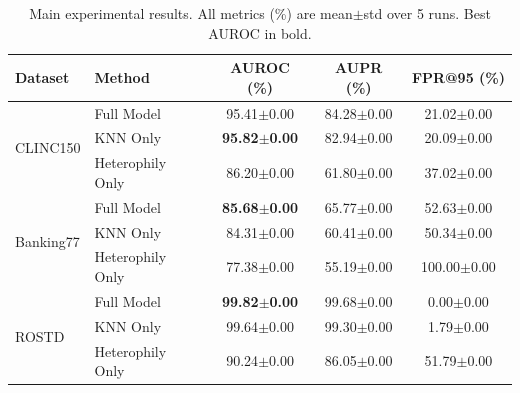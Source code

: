 \begin{table}[t]
\centering
\caption{Main experimental results. All metrics (\%) are mean$\pm$std over 5 runs. Best AUROC in bold.}
\label{tab:main_results}
\begin{tabular}{llccc}
\toprule
Dataset & Method & AUROC (\%) & AUPR (\%) & FPR@95 (\%) \\
\midrule
\multirow{3}{*}{CLINC150}
& Full Model & 95.41$\pm$0.00 & 84.28$\pm$0.00 & 21.02$\pm$0.00 \\
& KNN Only & \textbf{95.82$\pm$0.00} & 82.94$\pm$0.00 & 20.09$\pm$0.00 \\
& Heterophily Only & 86.20$\pm$0.00 & 61.80$\pm$0.00 & 37.02$\pm$0.00 \\
\midrule
\multirow{3}{*}{Banking77}
& Full Model & \textbf{85.68$\pm$0.00} & 65.77$\pm$0.00 & 52.63$\pm$0.00 \\
& KNN Only & 84.31$\pm$0.00 & 60.41$\pm$0.00 & 50.34$\pm$0.00 \\
& Heterophily Only & 77.38$\pm$0.00 & 55.19$\pm$0.00 & 100.00$\pm$0.00 \\
\midrule
\multirow{3}{*}{ROSTD}
& Full Model & \textbf{99.82$\pm$0.00} & 99.68$\pm$0.00 & 0.00$\pm$0.00 \\
& KNN Only & 99.64$\pm$0.00 & 99.30$\pm$0.00 & 1.79$\pm$0.00 \\
& Heterophily Only & 90.24$\pm$0.00 & 86.05$\pm$0.00 & 51.79$\pm$0.00 \\
\bottomrule
\end{tabular}
\end{table}